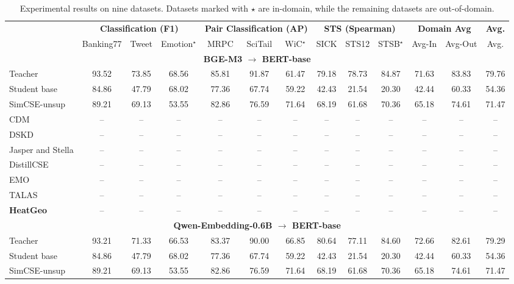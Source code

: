\begin{table}[t]
\centering
\caption{Experimental results on nine datasets. Datasets marked with $\star$ are in-domain, while the remaining datasets are out-of-domain.}
\label{tab:main_results}
\scriptsize
\setlength{\tabcolsep}{2.4pt}
\begin{tabular}{l|ccc|ccc|ccc|cc|c}
\hline
 & \multicolumn{3}{c|}{\textbf{Classification (F1)}} &
 \multicolumn{3}{c|}{\textbf{Pair Classification (AP)}} &
 \multicolumn{3}{c|}{\textbf{STS (Spearman)}} &
 \multicolumn{2}{c|}{\textbf{Domain Avg}} &
 \textbf{Avg.} \\
 & Banking77 & Tweet & Emotion$^{\star}$ &
 MRPC & SciTail & WiC$^{\star}$ &
 SICK & STS12 & STSB$^{\star}$ &
 Avg-In & Avg-Out & Avg. \\
\hline
\multicolumn{13}{c}{\textbf{BGE-M3 $\rightarrow$ BERT-base}} \\
\hline
Teacher & 93.52 & 73.85 & 68.56 & 85.81 & 91.87 & 61.47 & 79.18 & 78.73 & 84.87 & 71.63 & 83.83 & 79.76 \\
Student base & 84.86 & 47.79 & 68.02 & 77.36 & 67.74 & 59.22 & 42.43 & 21.54 & 20.30 & 42.44 & 60.33 & 54.36 \\
SimCSE-unsup & 89.21 & 69.13 & 53.55 & 82.86 & 76.59 & 71.64 & 68.19 & 61.68 & 70.36 & 65.18 & 74.61 & 71.47 \\
\hline
CDM & -- & -- & -- & -- & -- & -- & -- & -- & -- & -- & -- & -- \\
DSKD & -- & -- & -- & -- & -- & -- & -- & -- & -- & -- & -- & -- \\
Jasper and Stella & -- & -- & -- & -- & -- & -- & -- & -- & -- & -- & -- & -- \\
DistillCSE & -- & -- & -- & -- & -- & -- & -- & -- & -- & -- & -- & -- \\
EMO & -- & -- & -- & -- & -- & -- & -- & -- & -- & -- & -- & -- \\
TALAS & -- & -- & -- & -- & -- & -- & -- & -- & -- & -- & -- & -- \\
\textbf{HeatGeo} & -- & -- & -- & -- & -- & -- & -- & -- & -- & -- & -- & -- \\
\hline
\multicolumn{13}{c}{\textbf{Qwen-Embedding-0.6B $\rightarrow$ BERT-base}} \\
\hline
Teacher & 93.21 & 71.33 & 66.53 & 83.37 & 90.00 & 66.85 & 80.64 & 77.11 & 84.60 & 72.66 & 82.61 & 79.29 \\
Student base & 84.86 & 47.79 & 68.02 & 77.36 & 67.74 & 59.22 & 42.43 & 21.54 & 20.30 & 42.44 & 60.33 & 54.36 \\
SimCSE-unsup & 89.21 & 69.13 & 53.55 & 82.86 & 76.59 & 71.64 & 68.19 & 61.68 & 70.36 & 65.18 & 74.61 & 71.47 \\

\end{tabular}
\end{table}
